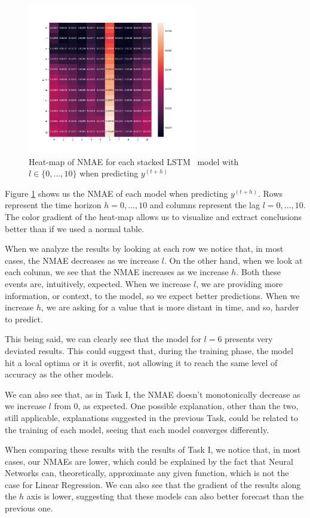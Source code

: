 \documentclass[10pt]{article}
\begin{document}
\begin{figure}[h!]
    \centering
    \includegraphics[width=0.65\textwidth,height=\textheight,keepaspectratio]{../result/project2/lstm_nmae_heatmap.png}
    \caption{Heat-map of \textsc{NMAE} for each stacked LSTM~\cite{SLSTM} model with $l\in\{0,...,10\}$ when predicting $y^{(t+h)}$}
    \label{fig:2}
\end{figure}


Figure \ref{fig:2} shows us the \textsc{NMAE} of each model when predicting $y^{(t+h)}$. Rows represent the time horizon $h = 0,...,10$ and columns represent the lag $l = 0,...,10$. The color gradient of the heat-map allows us to visualize and extract conclusions better than if we used a normal table.

When we analyze the results by looking at each row we notice that, in most cases, the \textsc{NMAE} decreases as we increase $l$. On the other hand, when we look at each column, we see that the \textsc{NMAE} increases as we increase $h$. Both these events are, intuitively, expected. When we increase $l$, we are providing more information, or context, to the model, so we expect better predictions. When we increase $h$, we are asking for a value that is more distant in time, and so, harder to predict.

This being said, we can clearly see that the model for $l = 6$ presents very deviated results. This could suggest that, during the training phase, the model hit a local optima or it is overfit, not allowing it to reach the same level of accuracy as the other models.

We can also see that, as in Task I, the \textsc{NMAE} doesn't monotonically decrease as we increase $l$ from 0, as expected. One possible explanation, other than the two, still applicable, explanations suggested in the previous Task, could be related to the training of each model, seeing that each model converges differently.

When comparing these results with the results of Task I, we notice that, in most cases, our \textsc{NMAE}s are lower, which could be explained by the fact that Neural Networks can, theoretically, approximate any given function, which is not the case for Linear Regression.
We can also see that the gradient of the results along the $h$ axis is lower, suggesting that these models can also better forecast than the previous one.

\printbibliography
\end{document}
